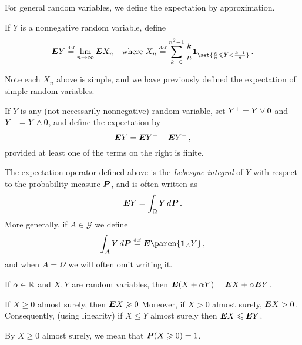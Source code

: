 For general random variables, we define the expectation by approximation.
\begin{definition}
  If $Y$ is a nonnegative random variable, define
  \begin{equation*}
    \E Y \defeq \lim_{n \to \infty} \E X_n
    \quad\text{where }
    X_n \defeq \sum_{k=0}^{n^2-1} \frac{k}{n} \one_{\set{\frac{k}{n} \leq Y < \frac{k+1}{n}}}\,.
  \end{equation*}
\end{definition}
\begin{remark}
  Note each $X_n$ above is simple, and we have previously defined the expectation of simple random variables.
\end{remark}
\begin{definition}
  If $Y$ is any (not necessarily nonnegative) random variable, set $Y^+ = Y \varmax 0$ and $Y^- = Y \varmin 0$, and define the expectation by
  \begin{equation*}
    \E Y = \E Y^+ - \E Y^-\,,
  \end{equation*}
  provided at least one of the terms on the right is finite.
\end{definition}
\begin{remark}
  The expectation operator defined above is the \emph{Lebesgue integral} of $Y$ with respect to the probability measure $\P$, and is often written as
  \begin{equation*}
    \E Y = \int_\Omega Y \, d\P\,.
  \end{equation*}
  More generally, if $A \in \mathcal G$ we define
  \begin{equation*}
    \int_A Y \, d\P \defeq \E \paren{ \one_{A} Y} \,,
  \end{equation*}
  and when $A = \Omega$ we will often omit writing it.
\end{remark}

\begin{proposition}[Linearity]
  If $\alpha \in \R$ and $X, Y$ are random variables, then $\E(X + \alpha Y) = \E X + \alpha \E Y$.
\end{proposition}

\begin{proposition}[Positivity]
  If $X \geq 0$ almost surely, then $\E X \geq 0$
  Moreover, if $X > 0$ almost surely, $\E X > 0$.
  Consequently, (using linearity) if $X \leq Y$ almost surely then $\E X \leq \E Y$.
\end{proposition}
\begin{remark}
  By $X \geq 0$ almost surely, we mean that $\P(X \geq 0) = 1$.
\end{remark}

